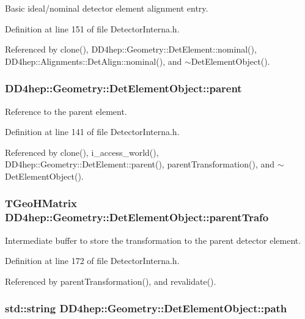 Basic ideal/nominal detector element alignment entry. 

Definition at line 151 of file DetectorInterna.h.

Referenced by clone(), DD4hep::Geometry::DetElement::nominal(), DD4hep::Alignments::DetAlign::nominal(), and $\sim$DetElementObject().\hypertarget{class_d_d4hep_1_1_geometry_1_1_det_element_object_a70ce8bf0603c0a7a4f6331faf71e66b6}{
\subsubsection[{parent}]{ {\bf DD4hep::Geometry::DetElementObject::parent}}}
\label{class_d_d4hep_1_1_geometry_1_1_det_element_object_a70ce8bf0603c0a7a4f6331faf71e66b6}


Reference to the parent element. 

Definition at line 141 of file DetectorInterna.h.

Referenced by clone(), i\_\-access\_\-world(), DD4hep::Geometry::DetElement::parent(), parentTransformation(), and $\sim$DetElementObject().\hypertarget{class_d_d4hep_1_1_geometry_1_1_det_element_object_a3d0d575da80e9a118c5e36f53e265339}{
\subsubsection[{parentTrafo}]{\setlength{\rightskip}{0pt plus 5cm}TGeoHMatrix {\bf DD4hep::Geometry::DetElementObject::parentTrafo}}}
\label{class_d_d4hep_1_1_geometry_1_1_det_element_object_a3d0d575da80e9a118c5e36f53e265339}


Intermediate buffer to store the transformation to the parent detector element. 

Definition at line 172 of file DetectorInterna.h.

Referenced by parentTransformation(), and revalidate().\hypertarget{class_d_d4hep_1_1_geometry_1_1_det_element_object_a6346cce7b6b1f96a5f33a41f2f9e219f}{
\subsubsection[{path}]{\setlength{\rightskip}{0pt plus 5cm}std::string {\bf DD4hep::Geometry::DetElementObject::path}}}
\label{class_d_d4hep_1_1_geometry_1_1_det_element_object_a6346cce7b6b1f96a5f33a41f2f9e219f}



